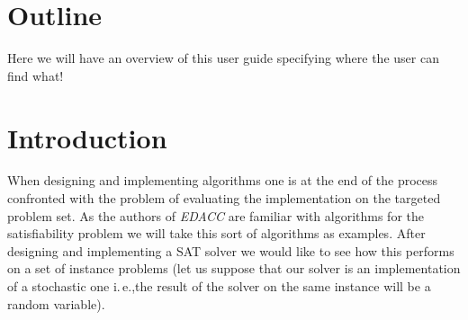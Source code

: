 \documentclass[twoside,a4paper]{refart}
\theoremstyle{dotless}
\newcommand{\ie}{i.\,e.,}
\newcommand{\edacc}{\textit{EDACC} }
\newcounter{ex}
\begin{document}

	

\section{Outline}
\label{outline}
Here we will have an overview of this user guide specifying where the user can find what!

\section{Introduction}

When designing and implementing algorithms one is at the end of the process confronted with the problem of evaluating the implementation on the targeted problem set. As the authors of \edacc are familiar with algorithms for the satisfiability problem we will take this sort of algorithms as examples. After designing and implementing a SAT solver we would like to see how this performs on a set of instance problems (let us suppose that our solver is an implementation of a stochastic one \ie the result of the solver on the same instance will be a random variable).
\end{document}
